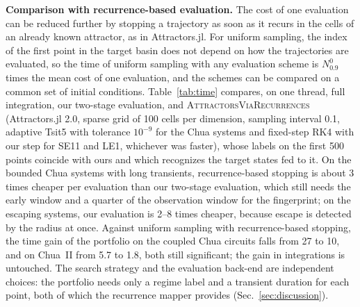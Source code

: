 \textbf{Comparison with recurrence-based evaluation.} The cost of one evaluation can be reduced further by stopping a trajectory as soon as it recurs in the cells of an already known attractor, as in Attractors.jl.\cite{DatserisWagemakers2022,Datseris2023Framework} For uniform sampling, the index of the first point in the target basin does not depend on how the trajectories are evaluated, so the time of uniform sampling with any evaluation scheme is $N^0_{0.9}$ times the mean cost of one evaluation, and the schemes can be compared on a common set of initial conditions. Table~\ref{tab:time} compares, on one thread, full integration, our two-stage evaluation, and \textsc{AttractorsViaRecurrences} (Attractors.jl 2.0, sparse grid of 100 cells per dimension, sampling interval 0.1, adaptive Tsit5 with tolerance $10^{-9}$ for the Chua systems and fixed-step RK4 with our step for SE11 and LE1, whichever was faster), whose labels on the first 500 points coincide with ours and which recognizes the target states fed to it. On the bounded Chua systems with long transients, recurrence-based stopping is about 3 times cheaper per evaluation than our two-stage evaluation, which still needs the early window and a quarter of the observation window for the fingerprint; on the escaping systems, our evaluation is 2--8 times cheaper, because escape is detected by the radius at once. Against uniform sampling with recurrence-based stopping, the time gain of the portfolio on the coupled Chua circuits falls from 27 to 10, and on Chua~II from 5.7 to 1.8, both still significant; the gain in integrations is untouched. The search strategy and the evaluation back-end are independent choices: the portfolio needs only a regime label and a transient duration for each point, both of which the recurrence mapper provides (Sec.~\ref{sec:discussion}).

